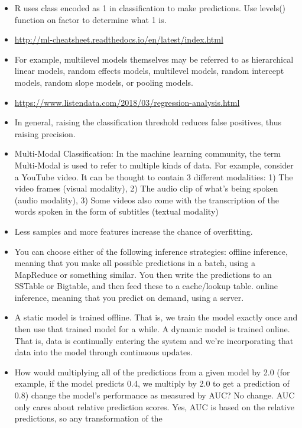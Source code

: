 \documentclass[]{book}
\theoremstyle{definition}
\theoremstyle{definition}
\theoremstyle{definition}
\theoremstyle{remark}
\begin{document}
\begin{itemize}
\item
  R uses class encoded as 1 in classification to make predictions. Use
  levels() function on factor to determine what 1 is.
\item
  \url{http://ml-cheatsheet.readthedocs.io/en/latest/index.html}
\item
  For example, multilevel models themselves may be referred to as
  hierarchical linear models, random effects models, multilevel models,
  random intercept models, random slope models, or pooling models.
\item
  \url{https://www.listendata.com/2018/03/regression-analysis.html}
\item
  In general, raising the classification threshold reduces false
  positives, thus raising precision.
\item
  Multi-Modal Classification: In the machine learning community, the
  term Multi-Modal is used to refer to multiple kinds of data. For
  example, consider a YouTube video. It can be thought to contain 3
  different modalities: 1) The video frames (visual modality), 2) The
  audio clip of what's being spoken (audio modality), 3) Some videos
  also come with the transcription of the words spoken in the form of
  subtitles (textual modality)
\item
  Less samples and more features increase the chance of overfitting.
\item
  You can choose either of the following inference strategies: offline
  inference, meaning that you make all possible predictions in a batch,
  using a MapReduce or something similar. You then write the predictions
  to an SSTable or Bigtable, and then feed these to a cache/lookup
  table. online inference, meaning that you predict on demand, using a
  server.
\item
  A static model is trained offline. That is, we train the model exactly
  once and then use that trained model for a while. A dynamic model is
  trained online. That is, data is continually entering the system and
  we're incorporating that data into the model through continuous
  updates.
\item
  How would multiplying all of the predictions from a given model by 2.0
  (for example, if the model predicts 0.4, we multiply by 2.0 to get a
  prediction of 0.8) change the model's performance as measured by AUC?
  No change. AUC only cares about relative prediction scores. Yes, AUC
  is based on the relative predictions, so any transformation of the

\end{itemize}
\end{document}

